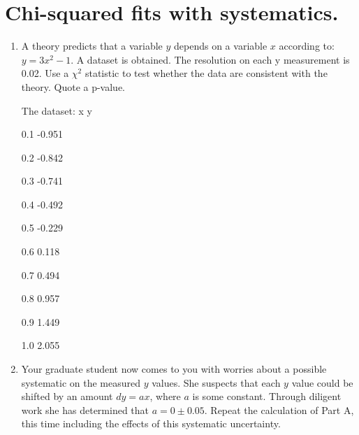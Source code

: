 \section{Chi-squared fits with systematics.}

\begin{enumerate}[label=\textbf{\Alph*}.]
    \item A theory predicts that a variable $y$ depends on a variable $x$ according to: $y = 3x^2 -1$. A dataset is obtained. The resolution on each y measurement is 0.02. Use a $\chi^2$ statistic to test whether the data are consistent with the theory. Quote a p-value.

    The dataset: x y

    0.1 -0.951
    
    0.2 -0.842
    
    0.3 -0.741
    
    0.4 -0.492
    
    0.5 -0.229
    
    0.6 0.118
    
    0.7 0.494
    
    0.8 0.957
    
    0.9 1.449
    
    1.0 2.055

    \item Your graduate student now comes to you with worries about a possible systematic on the measured $y$ values. She suspects that each $y$ value could be shifted by an amount $dy=ax$, where $a$ is some constant. Through diligent work she has determined that $a=0\pm0.05$. Repeat the calculation of Part A, this time including the effects of this systematic uncertainty.

    
\end{enumerate}
